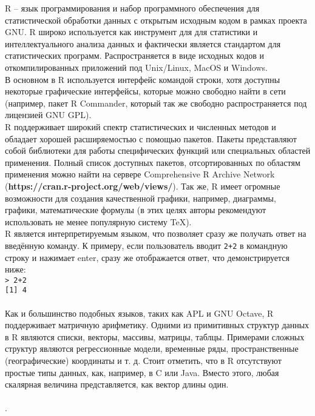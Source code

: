 
    R – язык программирования и набор программного обеспечения для статистической обработки 
    данных с открытым исходным кодом в рамках проекта GNU. R широко используется как 
    инструмент для для статистики и интеллектуального анализа данных и фактически является стандартом
    для статистических программ. Распространяется в виде исходных кодов и откомпилированных
    приложений под Unix/Linux, MacOS и Windows. \\
    
    \indent В основном в R используется интерфейс командой строки, хотя доступны некоторые графические
    интерфейсы, которые можно свободно найти в сети (например, пакет R Commander, который так
    же свободно распространяется под лицензией GNU GPL). \\ 
    
    \indent R поддерживает широкий спектр статистических и численных методов и обладает хорошей расширяемостью 
    с помощью пакетов. Пакеты представляют собой библиотеки для работы специфических функций или 
    специальных областей применения. Полный список доступных пакетов, отсортированных по областям 
    применения можно найти на сервере Comprehensive R Archive Network (\textbf{https://cran.r-project.org/web/views/}). Так же, R имеет огромные 
    возможности для создания качественной графики, например, диаграммы, графики, математические формулы 
    (в этих целях авторы рекомендуют использовать не менее популярную систему TeX). \\
    
    \indent R является интерпретируемым языком, что позволяет сразу же получать ответ на введённую
    команду. К примеру, если пользователь вводит \texttt{2+2} в командную строку и нажимает enter, сразу же
    отображается ответ, что демонстрируется ниже: \\
    \indent \texttt{> 2+2} \\ 
    \indent \texttt{[1] 4} \\ \\
    
    \indent Как и большинство подобных языков, таких как APL и GNU Octave, R поддерживает матричную арифметику.
    Одними из примитивных структур данных в R являются списки, векторы, массивы, матрицы, таблцы.
    Примерами сложных структур являются регрессионные модели, временные ряды, пространственные 
    (географические) координаты и т. д. Стоит отметить, что в R отсутствуют простые типы данных, как,
    например, в C или Java. Вместо этого, любая скалярная величина представляется, как вектор длины один. \\ \\ 
    .

